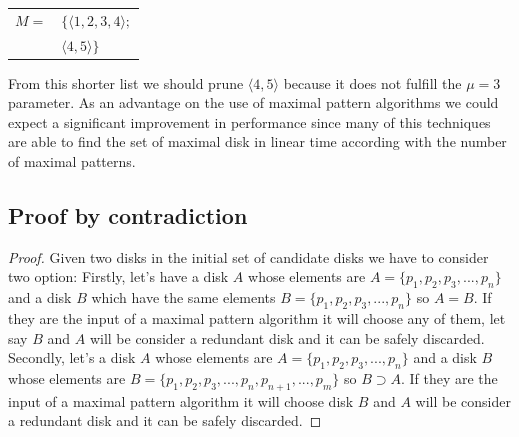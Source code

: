 \documentclass[10pt]{scrartcl}
\begin{document}
\vspace{2mm}
\begin{tabular}{r l}
$M =$ 	& $\{ \langle 1, 2, 3, 4 \rangle; $\\
	& $   \langle 4, 5 \rangle \} $	\\
\end{tabular}
\vspace{2mm}

From this shorter list we should prune $\langle 4, 5 \rangle$ because it does not fulfill the $\mu = 3$ parameter. As an advantage on the use of maximal pattern algorithms we could expect a significant improvement in performance since many of this techniques are able to find the set of maximal disk in linear time according with the number of maximal patterns. 
    
\subsection*{Proof by contradiction}
\begin{proof}
Given two disks in the initial set of candidate disks we have to consider two option:  Firstly, let's have a disk $A$ whose elements are $A = \{p_1, p_2, p_3, ..., p_n\}$ and a disk $B$ which have the same elements $B = \{p_1, p_2, p_3, ..., p_n\}$ so $A = B$.  If they are the input of a maximal pattern algorithm it will choose any of them, let say $B$ and $A$ will be consider a redundant disk and it can be safely discarded.  Secondly, let's a disk $A$ whose elements are $A = \{p_1, p_2, p_3, ..., p_n\}$ and a disk $B$ whose elements are $B = \{p_1, p_2, p_3, ..., p_n, p_{n+1}, ..., p_m\}$ so $B \supset A$.  If they are the input of a maximal pattern algorithm it will choose disk $B$ and $A$ will be consider a redundant disk and it can be safely discarded. 
\end{proof}
\end{document}
